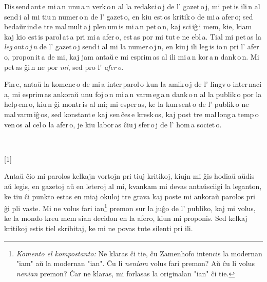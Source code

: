 \documentclass[ngerman,12pt,twoside]{book}
\begin{document}
Dis\,send\,ant\,e mi\,a\,n unu\,a\,n verk\,o\,n al la redakci\,o\,j de l' gazet\,o\,j, mi pet\,is ili\,n al\,send\,i al mi tiu\,n numer\,o\,n de l' gazet\,o, en kiu est\,os kritik\,o de mi\,a afer\,o; sed bedaŭr\,ind\,e tre mal\,mult\,a\,j plen\,um\,is mi\,a\,n pet\,o\,n, kaj sci\,iĝ\,i mem, kie, kiam kaj kio est\,is parol\,at\,a pri mi\,a afer\,o, est\,as por mi tut\,e ne ebl\,a. Tial mi pet\,as la \emph{leg\,ant\,o\,j\,n} de l' gazet\,o\,j send\,i al mi la numer\,o\,j\,n, en kiu\,j ili leg\,is io\,n pri l' afer\,o, propon\,it\,a de mi, kaj jam antaŭ\,e mi esprim\,as al ili mi\,a\,n kor\,a\,n dank\,o\,n. Mi pet\,as ĝi\,n ne por \emph{mi}, sed pro l' \emph{afer\,o}.

Fin\,e, antaŭ la komenc\,o de mi\,a inter\,parol\,o kun la amik\,o\,j de l' lingv\,o inter\,naci\,a, mi esprim\,as ankoraŭ unu foj\,o\,n mi\,a\,n varm\,eg\,a\,n dank\,o\,n al la publik\,o por la help\,em\,o, kiu\,n ĝi montr\,is al mi; mi esper\,as, ke la kun\,sent\,o de l' publik\,o ne mal\,varm\,iĝ\,os, sed konstant\,e kaj sen\,ĉes\,e kresk\,os, kaj post tre mal\,long\,a temp\,o ven\,os al cel\,o la afer\,o, je kiu labor\,as ĉiu\,j sfer\,o\,j de l' hom\,a societ\,o. 

\begin{center}
\\[12pt]
{}
\scalebox{2}[1]{\large{}}
\end{center}

Antaŭ ĉio mi parolos kelkajn vortojn pri tiuj kritikoj, kiujn mi ĝis hodiaŭ aŭdis aŭ legis, en gazetoj aŭ en leteroj al mi, kvankam mi devas antaŭsciigi la leganton, ke tiu ĉi punkto estas en miaj okuloj tre grava kaj poste mi ankoraŭ parolos pri ĝi pli vaste. Mi ne volus fari ian\footnote{\emph{Komento el kompostanto:} Ne klaras ĉi tie, ĉu Zamenhofo intencis la modernan "iam" aŭ la modernan "ian".  Ĉu li \emph{neniam} volus fari premon?  Aŭ ĉu li volus \emph{nenian} premon?  Ĉar ne klaras, mi forlasas la originalan "ian" ĉi tie.} premon sur la juĝo de l' publiko, kaj mi volus, ke la mondo kreu mem sian decidon en la afero, kiun mi proponis. Sed kelkaj kritikoj estis tiel skribitaj, ke mi ne povas tute silenti pri ili.
\end{document}
